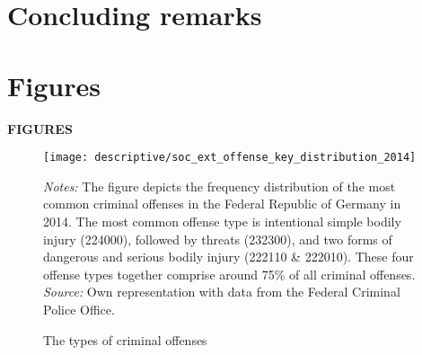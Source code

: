 \documentclass[11pt, a4paper]{article} %
\begin{document}
\bigskip
\section{Concluding remarks}\label{sec_soc_ext:conclusion}




\newpage






\newpage
\TODO\section{Figures}
\vspace*{\fill}
{\Huge \begin{center}\textbf{FIGURES}\end{center}}
\vspace*{\fill}\clearpage






\vspace*{\fill}
\begin{figure}[H]\centering
	\caption{The types of criminal offenses}\label{fig_soc_ext:offense_types_distribution_2014}
	\texttt{[image: descriptive/soc\_ext\_offense\_key\_distribution\_2014]}
	\begin{minipage}{0.95\linewidth}
		\scriptsize{\emph{Notes:} The figure depicts the frequency distribution of the most common criminal offenses in the Federal Republic of Germany in 2014. The most common offense type is intentional simple bodily injury (224000), followed by threats (232300), and two forms of dangerous and serious bodily injury (222110 \& 222010). These four offense types together comprise around 75\% of all criminal offenses. \newline \emph{Source:} Own representation with data from the Federal Criminal Police Office.}
	\end{minipage}
\end{figure}
\vspace*{\fill}\clearpage
\end{document}
